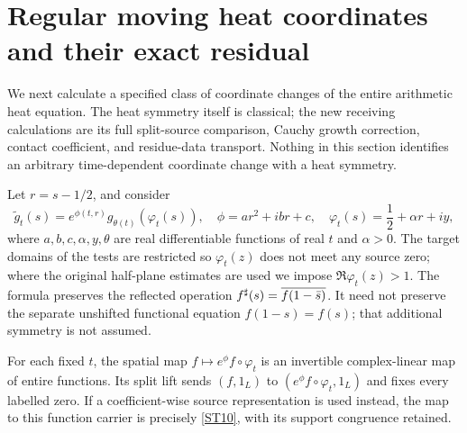 \documentclass[11pt,a4paper]{article}
\theoremstyle{definition}\newtheorem{definition}[theorem]{Definition}
\begin{document}
\section{Regular moving heat coordinates and their exact residual}
We next calculate a specified class of coordinate changes of the entire arithmetic heat equation. The heat symmetry itself is classical; the new receiving calculations are its full split-source comparison, Cauchy growth correction, contact coefficient, and residue-data transport. Nothing in this section identifies an arbitrary time-dependent coordinate change with a heat symmetry.

Let $r=s-1/2$, and consider
\begin{equation}
 \widetilde g_t(s)=e^{\phi(t,r)}g_{\theta(t)}(\varphi_t(s)),
 \quad \phi=ar^2+ibr+c,
 \quad\varphi_t(s)=\frac12+\alpha r+iy,                         \tag{RG1}\label{RG1}
\end{equation}
where $a,b,c,\alpha,y,\theta$ are real differentiable functions of real $t$ and $\alpha>0$. The target domains of the tests are restricted so $\varphi_t(z)$ does not meet any source zero; where the original half-plane estimates are used we impose $\Re\varphi_t(z)>1$. The formula preserves the reflected operation $f^\sharp(s)=\overline{f(1-\bar s)}$. It need not preserve the separate unshifted functional equation $f(1-s)=f(s)$; that additional symmetry is not assumed.

For each fixed $t$, the spatial map $f\mapsto e^\phi f\circ\varphi_t$ is an invertible complex-linear map of entire functions. Its split lift sends $(f,1_L)$ to $(e^\phi f\circ\varphi_t,1_L)$ and fixes every labelled zero. If a coefficient-wise source representation is used instead, the map to this function carrier is precisely \eqref{ST10}, with its support congruence retained.
\end{document}
